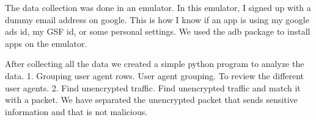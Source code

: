  The data collection was done in an emulator. In this emulator, I signed up with a dummy email address on google. This is how I know if an app is using my google ads id, my GSF id, or some personal settings.  
 We used the adb package to install apps on the emulator. 



After collecting all the data we created a simple python program to analyze the data. 
1. Grouping user agent rows.
User agent grouping.  To review the different user agents. 
2. Find unencrypted traffic. 
Find unencrypted traffic and match it with a packet. We have separated the unencrypted packet that sends sensitive information and that is not malicious.

